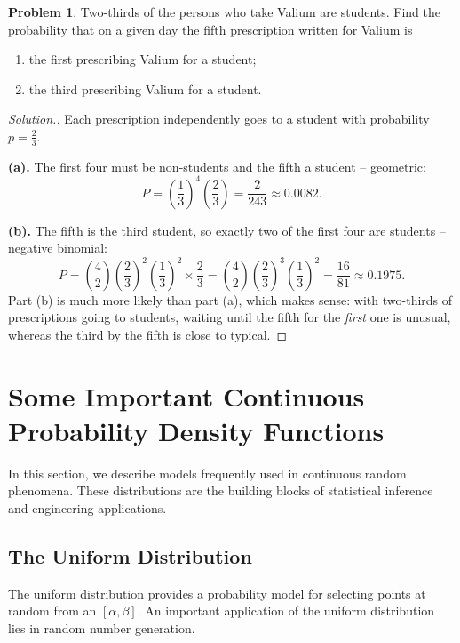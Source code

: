 \documentclass[12pt,a4paper]{report}
\theoremstyle{definition}
\theoremstyle{plain}
\theoremstyle{definition}
\newtheorem{problemx}{Problem}[section]
\newenvironment{problem}{\begin{problemx}}{\end{problemx}}
\newenvironment{solution}
  {\renewcommand{\qedsymbol}{}\begin{proof}[\textit{Solution}.]}
  {\end{proof}}
\begin{document}
\begin{problem}
Two-thirds of the persons who take Valium are students. Find the probability that on a
given day the fifth prescription written for Valium is
\begin{enumerate}
\item[(a).] the first prescribing Valium for a student;
\item[(b).] the third prescribing Valium for a student.
\end{enumerate}
\end{problem}

\begin{solution}
Each prescription independently goes to a student with probability $p = \tfrac23$.

\textbf{(a).} The first four must be non-students and the fifth a student -- geometric:
\[P = \left(\frac{1}{3}\right)^{4}\left(\frac{2}{3}\right) = \frac{2}{243}
 \approx 0.0082.\]

\textbf{(b).} The fifth is the third student, so exactly two of the first four are
students -- negative binomial:
\[P = \binom{4}{2}\left(\frac{2}{3}\right)^{2}\left(\frac{1}{3}\right)^{2}
 \times\frac{2}{3}
 = \binom{4}{2}\left(\frac{2}{3}\right)^{3}\left(\frac{1}{3}\right)^{2}
 = \frac{16}{81} \approx 0.1975.\]
Part (b) is much more likely than part (a), which makes sense: with two-thirds of
prescriptions going to students, waiting until the fifth for the \emph{first} one is
unusual, whereas the third by the fifth is close to typical.
\end{solution}

\section{Some Important Continuous Probability Density Functions}
\vspace{-15pt}
In this section, we describe models frequently used in continuous random phenomena. These distributions are the building blocks of statistical inference and engineering applications.


\subsection{The Uniform Distribution}
\vspace{-15pt}
The uniform distribution provides a probability model for selecting points at random from an $[\alpha , \beta]$. An important application of the uniform distribution lies in random number generation. 
\end{document}
